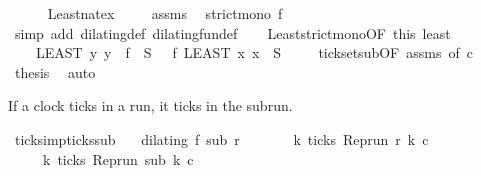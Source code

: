 \begin{isabellebody}
\ \ \ \ \isamarkupfalse%
\ Least{\isacharunderscore}nat{\isacharunderscore}ex\ \isacommand{{\isachardot}{\isachardot}}\isamarkupfalse%
\isanewline
\ \ \isamarkupfalse%
\ assms{\isacharparenleft}{}{\isacharparenright}\ \isamarkupfalse%
\ {\isacartoucheopen}strict{\isacharunderscore}mono\ f{\isacartoucheclose}\ \isamarkupfalse%
\ {\isacharparenleft}simp\ add{\isacharcolon}\ dilating{\isacharunderscore}def\ dilating{\isacharunderscore}fun{\isacharunderscore}def{\isacharparenright}\isanewline
\ \ \isamarkupfalse%
\ Least{\isacharunderscore}strict{\isacharunderscore}mono{\isacharbrackleft}OF\ this\ least{\isacharbrackright}\ \isamarkupfalse%
\isanewline
\ \ \ \ {\isacartoucheopen}{\isacharparenleft}LEAST\ y{\isachardot}\ y\ {\isasymin}\ f\ {\isacharbackquote}\ {\isacharquery}S{\isacharparenright}\ \ {\isacharequal}\ f\ {\isacharparenleft}LEAST\ x{\isachardot}\ x\ {\isasymin}\ {\isacharquery}S{\isacharparenright}{\isacartoucheclose}\ \isacommand{{\isachardot}}\isamarkupfalse%
\isanewline
\ \ \isamarkupfalse%
\ tick{\isacharunderscore}set{\isacharunderscore}sub{\isacharbrackleft}OF\ assms{\isacharparenleft}{}{\isacharparenright}{\isacharcomma}\ of\ {\isacartoucheopen}c{\isacartoucheclose}{\isacharbrackright}\ \isamarkupfalse%
\ {\isacharquery}thesis\ \isamarkupfalse%
\ auto\isanewline
{}\isamarkupfalse%
%
\endisatagproof
{\isafoldproof}%
%
\isadelimproof
%
\endisadelimproof
%
\begin{isamarkuptext}%
If a clock ticks in a run, it ticks in the subrun.%
\end{isamarkuptext}\isamarkuptrue%
\isamarkupfalse%
\ ticks{\isacharunderscore}imp{\isacharunderscore}ticks{\isacharunderscore}sub{\isacharcolon}\isanewline
\ \ \ {\isacartoucheopen}dilating\ f\ sub\ r{\isacartoucheclose}\isanewline
\ \ \ \ \ \ \ {\isacartoucheopen}{\isasymexists}k{\isachardot}\ ticks\ {\isacharparenleft}{\isacharparenleft}Rep{\isacharunderscore}run\ r{\isacharparenright}\ k\ c{\isacharparenright}{\isacartoucheclose}\isanewline
\ \ \ \ \ {\isacartoucheopen}{\isasymexists}k\ ticks\ {\isacharparenleft}{\isacharparenleft}Rep{\isacharunderscore}run\ sub{\isacharparenright}\ k\ c{\isacharparenright}{\isacartoucheclose}\isanewline
%
\isadelimproof
%
\endisadelimproof
%
\isatagproof
{}\isamarkupfalse%

\end{isabellebody}
